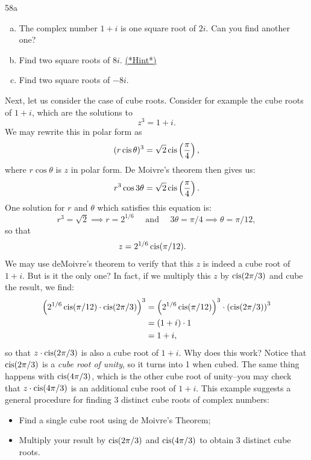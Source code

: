 \begin{exercise}{58a}
\begin{enumerate}[(a)]
\item
 The complex number $1 + i$ is one square root of $2i$. Can you find another one?
\item
Find two square roots of $8i$.
\hyperref[sec:complex:hints]{(*Hint*)}
\item
Find two square roots of $-8i$.
\end{enumerate}
\end{exercise}

Next, let us consider the case of cube roots. Consider for example the cube roots of $1 + i$, which are the solutions to
\[ z^3 = 1 + i. \]
We  may rewrite this in polar form as
\[ (r \operatorname{cis} \theta)^3 = \sqrt{2} \operatorname{cis}\left(\frac{\pi}{4}\right), \]
where $r \cos \theta$ is $z$ in polar form. De Moivre's theorem then gives us:
\[ r^3 \cos 3\theta = \sqrt{2} \operatorname{cis}\left(\frac{\pi}{4}\right). \]
One solution for $r$ and $\theta$ which satisfies this equation is:
\[ r^3 = \sqrt{2} \implies r=2^{1/6} \quad \textrm{ and } \quad 3\theta = \pi/4 \implies \theta = \pi/12, \]
so that
\begin{align*}
z &=  2^{1/6} \operatorname{cis}(\pi/12).
\end{align*}
We may use deMoivre's theorem to verify that this $z$ is indeed a cube root of $1+i$.  But is it the only one?
 In fact, if we multiply this $z$ by $\operatorname{cis}(2 \pi/3)$ and cube the result, we find:
\begin{align*}
 \left( 2^{1/6} \operatorname{cis}(\pi/12) \cdot \operatorname{cis}(2\pi/3) \right)^3 &= \left( 2^{1/6} \operatorname{cis}(\pi/12) \right)^3 \cdot \left(\operatorname{cis}(2\pi/3) \right)^3 \\
&= (1+i) \cdot 1 \\
&= 1+i,
\end{align*}
so that $z \cdot \operatorname{cis}(2\pi/3)$ is also a cube root of $1+i$.  Why does this work? Notice that $\operatorname{cis}(2\pi/3)$ is a \emph{cube root of unity}, so it turns into 1 when cubed. The same thing happens with $\operatorname{cis}(4\pi/3)$, which is the other cube root of unity--you may check that $z \cdot \operatorname{cis}(4\pi/3)$ is an additional cube root of $1+i$.
This example suggests a general procedure for finding $3$ distinct cube roots of complex numbers:
\begin{itemize}
\item Find a single cube root using de Moivre's Theorem;
\item Multiply your result by $ \operatorname{cis}(2\pi/3)$  and $ \operatorname{cis}(4\pi/3)$ to obtain $3$ distinct cube roots.
\end{itemize}

